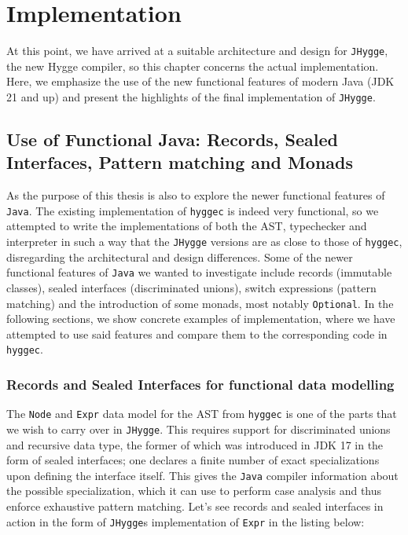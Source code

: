 \chapter{Implementation}

At this point, we have arrived at a suitable architecture and design for \texttt{JHygge}, the new Hygge compiler, so this chapter concerns the actual
implementation. Here, we emphasize the use of the new functional features of modern Java (JDK 21 and up) and present the highlights
of the final implementation of \texttt{JHygge}. 

\section{Use of Functional Java: Records, Sealed Interfaces, Pattern matching and Monads}

As the purpose of this thesis is also to explore the newer functional features of \texttt{Java}. The existing implementation of \texttt{hyggec}
is indeed very functional, so we attempted to write the implementations of both the AST, typechecker and interpreter in such a way that
the \texttt{JHygge} versions are as close to those of \texttt{hyggec}, disregarding the architectural and design differences. Some of
the newer functional features of \texttt{Java} we wanted to investigate include records (immutable classes), sealed interfaces (discriminated unions),
switch expressions (pattern matching) and the introduction of some monads, most notably \texttt{Optional}. In the following sections,
we show concrete examples of implementation, where we have attempted to use said features and compare them to the corresponding code
in \texttt{hyggec}.

\subsection{Records and Sealed Interfaces for functional data modelling}

The \texttt{Node} and \texttt{Expr} data model for the AST from \texttt{hyggec} is one of the parts that we wish to carry over in \texttt{JHygge}.
This requires support for discriminated unions and recursive data type, the former of which was introduced in JDK 17 in the form of sealed
interfaces; one declares a finite number of exact specializations upon defining the interface itself. This gives the \texttt{Java} compiler
information about the possible specialization, which it can use to perform case analysis and thus enforce exhaustive pattern matching. Let's
see records and sealed interfaces in action in the form of \texttt{JHygge}s implementation of \texttt{Expr} in the listing below:

